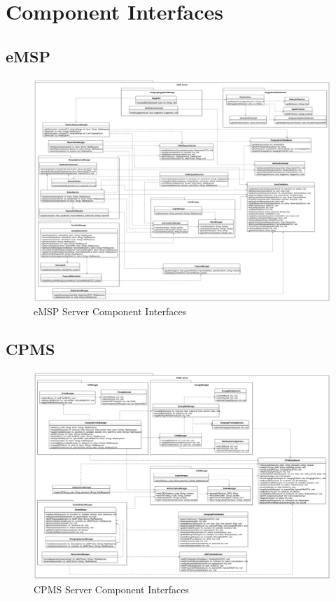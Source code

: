 \documentclass{Configuration_Files/PoliMi3i_thesis}
\begin{document}
\newpage
\section{Component Interfaces}

\subsection{eMSP}

\begin{figure}[H]
    \centering
    \includegraphics[width=1\textwidth]{Images/component/Component Interfaces eMSP.jpg}
    \caption{eMSP Server Component Interfaces}
    \label{fig:emsp-interfaces}
\end{figure}

\subsection{CPMS}

\begin{figure}[H]
    \centering
    \includegraphics[width=1\textwidth]{Images/component/CPMS Component Interfaces.jpg}
    \caption{CPMS Server Component Interfaces}
    \label{fig:cpms-interfaces}
\end{figure}
\end{document}
